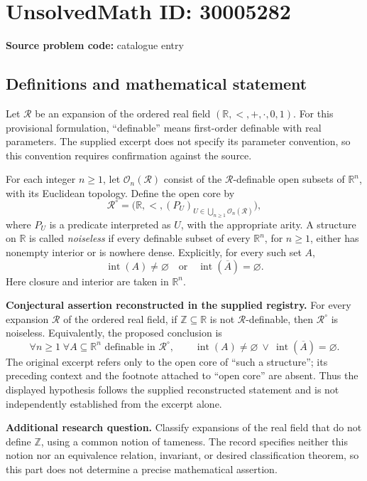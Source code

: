 \documentclass[11pt]{article}
\newcommand{\Z}{\mathbb{Z}}
\newcommand{\R}{\mathbb{R}}
\begin{document}
\section*{UnsolvedMath ID: 30005282}
\textbf{Source problem code:} catalogue entry
\subsection{Definitions and mathematical statement}
Let \(\mathcal R\) be an expansion of the ordered real field \((\R,<,+,\cdot,0,1)\). For this provisional formulation, ``definable'' means first-order definable with real parameters. The supplied excerpt does not specify its parameter convention, so this convention requires confirmation against the source.

For each integer \(n\geq 1\), let \(\mathcal O_n(\mathcal R)\) consist of the \(\mathcal R\)-definable open subsets of \(\R^n\), with its Euclidean topology. Define the open core by
\[
\mathcal R^{\circ}=\bigl(\R,<,(P_U)_{U\in\bigcup_{n\geq1}\mathcal O_n(\mathcal R)}\bigr),
\]
where \(P_U\) is a predicate interpreted as \(U\), with the appropriate arity. A structure on \(\R\) is called \emph{noiseless} if every definable subset of every \(\R^n\), for \(n\geq1\), either has nonempty interior or is nowhere dense. Explicitly, for every such set \(A\),
\[
\operatorname{int}(A)\neq\varnothing
\quad\text{or}\quad
\operatorname{int}(\overline A)=\varnothing.
\]
Here closure and interior are taken in \(\R^n\).

\textbf{Conjectural assertion reconstructed in the supplied registry.} For every expansion \(\mathcal R\) of the ordered real field, if \(\Z\subseteq\R\) is not \(\mathcal R\)-definable, then \(\mathcal R^{\circ}\) is noiseless. Equivalently, the proposed conclusion is
\[
\forall n\geq1\;\forall A\subseteq\R^n\text{ definable in }\mathcal R^{\circ},\qquad
\operatorname{int}(A)\neq\varnothing
\ \lor\ 
\operatorname{int}(\overline A)=\varnothing.
\]
The original excerpt refers only to the open core of ``such a structure''; its preceding context and the footnote attached to ``open core'' are absent. Thus the displayed hypothesis follows the supplied reconstructed statement and is not independently established from the excerpt alone.

\textbf{Additional research question.} Classify expansions of the real field that do not define \(\Z\), using a common notion of tameness. The record specifies neither this notion nor an equivalence relation, invariant, or desired classification theorem, so this part does not determine a precise mathematical assertion.
\end{document}
